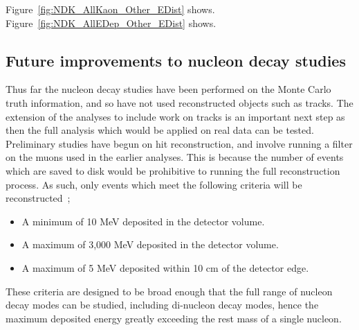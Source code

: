 Figure~\ref{fig:NDK_AllKaon_Other_EDist} shows. \\

Figure~\ref{fig:NDK_AllEDep_Other_EDist} shows. \\

\subsection{Future improvements to nucleon decay studies} \label{sec:NDKImprov}
Thus far the nucleon decay studies have been performed on the Monte Carlo truth information, and so have not used reconstructed objects such as tracks. The extension of the analyses to include work on tracks is an important next step as then the full analysis which would be applied on real data can be tested. Preliminary studies have begun on hit reconstruction, and involve running a filter on the muons used in the earlier analyses. This is because the number of events which are saved to disk would be prohibitive to running the full reconstruction process. As such, only events which meet the following criteria will be reconstructed~\citep{CosmoJanCollabMeeting};
\begin{itemize}
\item A minimum of 10 MeV deposited in the detector volume.
\item A maximum of 3,000 MeV deposited in the detector volume.
\item A maximum of 5 MeV deposited within 10 cm of the detector edge.
\end{itemize}
These criteria are designed to be broad enough that the full range of nucleon decay modes can be studied, including di-nucleon decay modes, hence the maximum deposited energy greatly exceeding the rest mass of a single nucleon. \\
